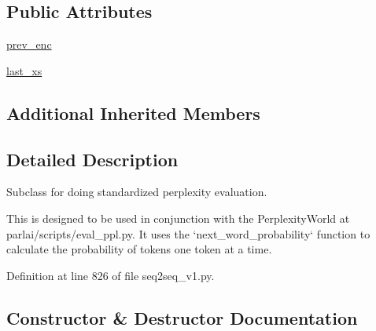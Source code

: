 \subsection*{Public Attributes}
\begin{DoxyCompactItemize}
\item 
\hyperlink{classparlai_1_1agents_1_1legacy__agents_1_1seq2seq_1_1seq2seq__v1_1_1PerplexityEvaluatorAgent_a8f896a71b1f4eef69d66f3ae48156937}{prev\+\_\+enc}
\item 
\hyperlink{classparlai_1_1agents_1_1legacy__agents_1_1seq2seq_1_1seq2seq__v1_1_1PerplexityEvaluatorAgent_a637c8434588948fb0367cd749c18e690}{last\+\_\+xs}
\end{DoxyCompactItemize}
\subsection*{Additional Inherited Members}


\subsection{Detailed Description}
\begin{DoxyVerb}Subclass for doing standardized perplexity evaluation.

This is designed to be used in conjunction with the PerplexityWorld at
parlai/scripts/eval_ppl.py. It uses the `next_word_probability` function
to calculate the probability of tokens one token at a time.
\end{DoxyVerb}
 

Definition at line 826 of file seq2seq\+\_\+v1.\+py.



\subsection{Constructor \& Destructor Documentation}
\mbox{\label{classparlai_1_1agents_1_1legacy__agents_1_1seq2seq_1_1seq2seq__v1_1_1PerplexityEvaluatorAgent_acf3daa1b1bfc893504efa07f3eb9b667}} 
